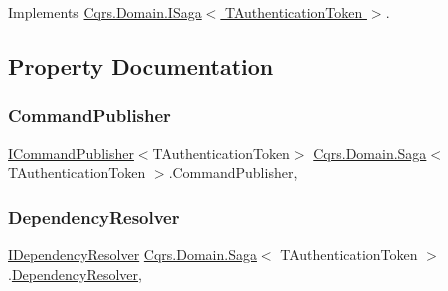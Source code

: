 Implements \hyperlink{interfaceCqrs_1_1Domain_1_1ISaga_a85c75f80bc5be4bad7f1d9f1231bfba7_a85c75f80bc5be4bad7f1d9f1231bfba7}{Cqrs.\+Domain.\+I\+Saga$<$ T\+Authentication\+Token $>$}.



\subsection{Property Documentation}
\mbox{\label{classCqrs_1_1Domain_1_1Saga_a944fc264b716dcd60a2e51c9897766fa_a944fc264b716dcd60a2e51c9897766fa}} 
\subsubsection{\texorpdfstring{Command\+Publisher}{CommandPublisher}}
{\footnotesize\ttfamily \hyperlink{interfaceCqrs_1_1Commands_1_1ICommandPublisher}{I\+Command\+Publisher}$<$T\+Authentication\+Token$>$ \hyperlink{classCqrs_1_1Domain_1_1Saga}{Cqrs.\+Domain.\+Saga}$<$ T\+Authentication\+Token $>$.Command\+Publisher\hspace{0.3cm}{\ttfamily [get]}, {\ttfamily [protected]}}

\mbox{\label{classCqrs_1_1Domain_1_1Saga_afd8b9bae392272e1651f2ea53c65db12_afd8b9bae392272e1651f2ea53c65db12}} 
\subsubsection{\texorpdfstring{Dependency\+Resolver}{DependencyResolver}}
{\footnotesize\ttfamily \hyperlink{interfaceCqrs_1_1Configuration_1_1IDependencyResolver}{I\+Dependency\+Resolver} \hyperlink{classCqrs_1_1Domain_1_1Saga}{Cqrs.\+Domain.\+Saga}$<$ T\+Authentication\+Token $>$.\hyperlink{classCqrs_1_1Configuration_1_1DependencyResolver}{Dependency\+Resolver}\hspace{0.3cm}{\ttfamily [get]}, {\ttfamily [protected]}}

